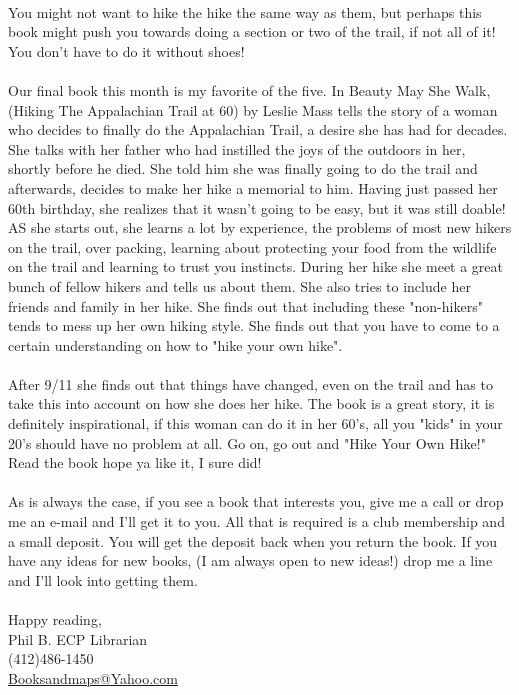 \documentclass[10pt,a4paper]{article}
\begin{document}
\\
	You might not want to hike the hike the same way as them, but perhaps this book might push you towards doing a section or two of the trail, if not all of it!  You don't have to do it without shoes!
\\
\\
	Our final book this month is my favorite of the five.  In Beauty May She Walk,(Hiking The Appalachian Trail at 60) by Leslie Mass tells the story of a woman who decides to finally do the Appalachian Trail, a desire she has had for decades.  She talks with her father who had instilled the joys of the outdoors in her, shortly before he died.  She told him she was finally going to do the trail and afterwards, decides to make her hike a memorial to him.  Having just passed her 60th birthday, she realizes that it wasn't going to be easy, but it was still doable!  AS she starts out, she learns a lot by experience, the problems of most new hikers on the trail, over packing, learning about protecting your food from the wildlife on the trail and learning to trust you instincts.   During her hike she meet a great bunch of fellow hikers  and tells us about them.  She also tries to include her friends and family in her hike.  She finds out that including these "non-hikers" tends to mess up her own hiking style.  She finds out that you have to come to a certain understanding on how to "hike your own hike".
\\
\\
	After 9/11 she finds out that things have changed, even on the trail and has to take this into account on how she does her hike.  The book is a great story, it is definitely inspirational, if this woman can do it in her 60's, all you "kids" in your 20's should have no problem at all.  Go on, go out and "Hike Your Own Hike!"  Read the book hope ya like it, I sure did!
\\
\\
	As is always the case, if you see a book that interests you, give me a call or drop me an e-mail and I'll get it to you.  All that is required is a club membership and a small deposit.  You will get the deposit back when you return the book.  If you have any ideas for new books, (I am always open to new ideas!) drop me a line and I'll look into getting them. 
\\
\\
Happy reading,\\
Phil B. ECP Librarian\\
(412)486-1450\\
\url{Booksandmaps@Yahoo.com}
\end{document}
